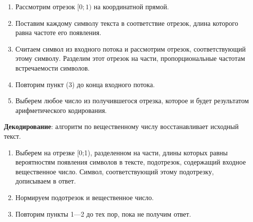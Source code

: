\begin{enumerate}
\item Рассмотрим отрезок $[0;1)$ на координатной прямой.
\item Поставим каждому символу текста в соответствие отрезок, длина которого равна частоте его появления.
\item Считаем символ из входного потока и рассмотрим отрезок, соответствующий этому символу. Разделим этот отрезок на части, пропорциональные частотам встречаемости символов.
\item Повторим пункт (3) до конца входного потока.
\item Выберем любое число из получившегося отрезка, которое и будет результатом арифметического кодирования.
\end{enumerate}

\textbf{Декодирование}: алгоритм по вещественному числу восстанавливает исходный текст.

\begin{enumerate}
\item Выберем на отрезке [0;1), разделенном на части, длины которых равны вероятностям появления символов в тексте, подотрезок, содержащий входное вещественное число. Символ, соответствующий этому подотрезку, дописываем в ответ.
\item Нормируем подотрезок и вещественное число.
\item Повторим пункты 1—2 до тех пор, пока не получим ответ.
\end{enumerate}

\begin{figure}[!h]
    
\end{figure}
  






